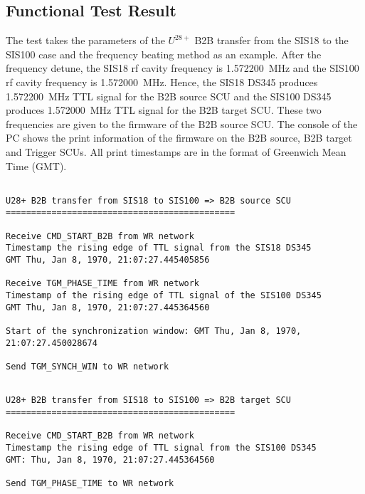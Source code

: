 \subsection{Functional Test Result}
\label{sec:function_result}
The test takes the parameters of the $U^{28+}$ B2B transfer from the SIS18 to the SIS100 case and the frequency beating method as an example. After the frequency detune, the SIS18 rf cavity frequency is \SI{1.572200}{\MHz} and the SIS100 rf cavity frequency is \SI{1.572000}{\MHz}. Hence, the SIS18 DS345 produces \SI{1.572200}{\MHz} TTL signal for the B2B source SCU and the SIS100 DS345 produces \SI{1.572000}{\MHz} TTL signal for the B2B target SCU. These two frequencies are given to the firmware of the B2B source SCU. The console of the PC shows the print information of the firmware on the B2B source, B2B target and Trigger SCUs. All print timestamps are in the format of Greenwich Mean Time (GMT). 
\begin{lstlisting}[language={[ANSI]C}, keywordstyle=\color{blue!70}, commentstyle=\color{red!50!green!50!blue!50}, frame=shadowbox, rulesepcolor=\color{red!20!green!20!blue!20}]

U28+ B2B transfer from SIS18 to SIS100 => B2B source SCU
=============================================

Receive CMD_START_B2B from WR network
Timestamp the rising edge of TTL signal from the SIS18 DS345 
GMT Thu, Jan 8, 1970, 21:07:27.445405856

Receive TGM_PHASE_TIME from WR network
Timestamp of the rising edge of TTL signal of the SIS100 DS345 
GMT Thu, Jan 8, 1970, 21:07:27.445364560

Start of the synchronization window: GMT Thu, Jan 8, 1970, 21:07:27.450028674

Send TGM_SYNCH_WIN to WR network
\end{lstlisting}

\begin{lstlisting}[language={[ANSI]C}, keywordstyle=\color{blue!70}, commentstyle=\color{red!50!green!50!blue!50}, frame=shadowbox, rulesepcolor=\color{red!20!green!20!blue!20}]

U28+ B2B transfer from SIS18 to SIS100 => B2B target SCU
=============================================

Receive CMD_START_B2B from WR network
Timestamp the rising edge of TTL signal from the SIS100 DS345 
GMT: Thu, Jan 8, 1970, 21:07:27.445364560

Send TGM_PHASE_TIME to WR network
\end{lstlisting}

